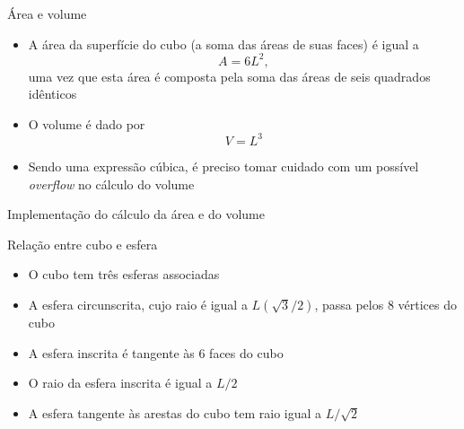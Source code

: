 \begin{frame}[fragile]{Área e volume}

    \begin{itemize}
        \item A área da superfície do cubo (a soma das áreas de suas faces) é igual a
            \[
                A = 6L^2,
            \] uma vez que esta área é composta pela soma das áreas de seis quadrados
            idênticos
        \pause

        \item O volume é dado por 
        \[
            V = L^3
        \]
        \pause

        \item Sendo uma expressão cúbica, é preciso tomar cuidado com um possível \textit{overflow} no cálculo do volume
    \end{itemize}

\end{frame}

\begin{frame}[fragile]{Implementação do cálculo da área e do volume}
\end{frame}

\begin{frame}[fragile]{Relação entre cubo e esfera}

    \begin{itemize}
        \item O cubo tem três esferas associadas
        \pause

        \item A esfera circunscrita, cujo raio é igual a $L(\sqrt{3}/2)$, passa pelos 8 vértices do 
            cubo
        \pause

        \item A esfera inscrita é tangente às 6 faces do cubo
        \pause

        \item O raio da esfera inscrita é igual a $L/2$
        \pause

        \item A esfera tangente às arestas do cubo tem raio igual a $L/\sqrt{2}$

    \end{itemize}

\end{frame}
